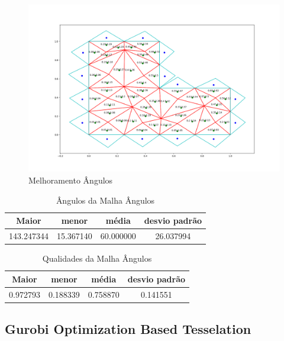 \begin{figure}[ht]
    \centering
    \includegraphics[width=1\linewidth]{fig/malha-angulos.png}
    \caption{Melhoramento Ângulos}
    \label{fig:malha-angulos}
\end{figure}

\begin{table}[hb]
\centering
\par\caption{Ângulos da Malha Ângulos}
\begin{tabular}{c|c|c|c}
Maior&menor&média&desvio padrão\\\hline\hline
143.247344&15.367140&60.000000&26.037994\\\hline
\end{tabular}
\label{tab:angulos-malha-angulos}
\end{table}

\begin{table}[hb]
\centering
\par\caption{Qualidades da Malha Ângulos}
\begin{tabular}{c|c|c|c}
Maior&menor&média&desvio padrão\\\hline\hline
0.972793&0.188339&0.758870&0.141551\\\hline
\end{tabular}
\label{tab:qualidades-malha-angulos}
\end{table}

\newpage
\subsection{Gurobi Optimization Based Tesselation}

